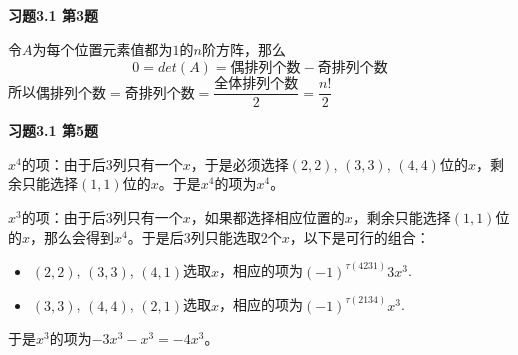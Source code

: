 \newpageorvspace

{\bf 习题3.1 第3题}

令$A$为每个位置元素值都为$1$的$n$阶方阵，那么
$$0 = det(A) = \text{偶排列个数} - \text{奇排列个数}$$
所以$\text{偶排列个数} = \text{奇排列个数} = \dfrac{\text{全体排列个数}}{2} = \dfrac{n!}{2}$

\newpageorvspace

{\bf 习题3.1 第5题}

$x^4$的项：由于后3列只有一个$x$，于是必须选择$(2,2)$, $(3,3)$, $(4,4)$位的$x$，剩余只能选择$(1,1)$位的$x$。于是$x^4$的项为$x^4$。

$x^3$的项：由于后3列只有一个$x$，如果都选择相应位置的$x$，剩余只能选择$(1,1)$位的$x$，那么会得到$x^4$。于是后3列只能选取2个$x$，以下是可行的组合：
\begin{itemize}
    \item $(2,2)$, $(3,3)$, $(4,1)$选取$x$，相应的项为$(-1)^{\tau(4231)}3x^3$.
    \item $(3,3)$, $(4,4)$, $(2,1)$选取$x$，相应的项为$(-1)^{\tau(2134)}x^3$.
\end{itemize}
于是$x^3$的项为$-3x^3-x^3 = -4x^3$。

\newpageorvspace


